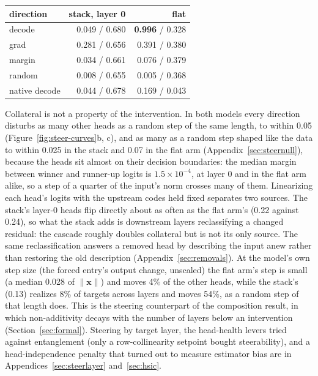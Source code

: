 \begin{center}\small
\begin{tabular}{@{}lrr@{}}
\toprule
direction & stack, layer 0 & flat \\
\midrule
decode & 0.049 / 0.680 & \textbf{0.996} / 0.328 \\
grad   & 0.281 / 0.656 & 0.391 / 0.380 \\
margin & 0.034 / 0.661 & 0.076 / 0.379 \\
random & 0.008 / 0.655 & 0.005 / 0.368 \\
\midrule
native decode & 0.044 / 0.678 & 0.169 / 0.043 \\
\bottomrule
\end{tabular}
\end{center}

Collateral is not a property of the intervention. In both models every
direction disturbs as many other heads as a random step of the same
length, to within 0.05 (Figure~\ref{fig:steer-curves}b, c), and as many
as a random step shaped like the data to within 0.025 in the stack and
0.07 in the flat arm (Appendix~\ref{sec:steernull}), because the heads sit almost on their decision
boundaries: the median margin between winner and runner-up logits is
$1.5\times10^{-4}$, at layer 0 and in the flat arm alike, so a step of a
quarter of the input's norm crosses many of them. Linearizing each head's
logits with the upstream codes held fixed separates two sources. The
stack's layer-0 heads flip directly about as often as the flat arm's (0.22
against 0.24), so what the stack adds is downstream layers reclassifying a
changed residual: the cascade roughly doubles collateral but is not its
only source. The same reclassification answers a removed head by
describing the input anew rather than restoring the old description
(Appendix~\ref{sec:removals}). At the model's own step size (the forced entry's output
change, unscaled) the flat arm's step is small (a median 0.028 of
$\lVert\mathbf{x}\rVert$) and moves 4\% of the other heads, while the
stack's (0.13) realizes 8\% of targets across layers and moves 54\%, as a
random step of that length does. This is the steering counterpart of the
composition result, in which non-additivity decays with the number of
layers below an intervention (Section~\ref{sec:formal}). Steering by
target layer, the head-health levers tried against entanglement (only a
row-collinearity setpoint bought steerability), and a head-independence
penalty that turned out to measure estimator bias are in
Appendices~\ref{sec:steerlayer} and~\ref{sec:hsic}.

